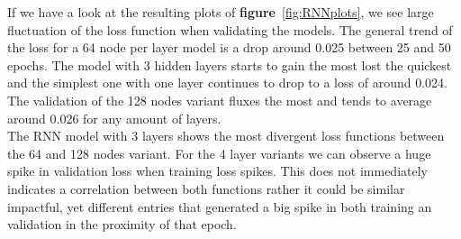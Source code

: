 \documentclass[11pt]
{article}
\begin{document}
If we have a look at the resulting plots of \textbf{figure}~\ref{fig:RNNplots}, we see large fluctuation of the loss function when validating the models. The general trend of the loss for a 64 node per layer model is a drop around 0.025 between 25 and 50 epochs. The model with 3 hidden layers starts to gain the most lost the quickest and the simplest one with one layer continues to drop to a loss of around 0.024. The validation of the 128 nodes variant  fluxes the most and tends to average around 0.026 for any amount of layers.
\\
The RNN model with 3 layers shows the most divergent loss functions between the 64 and 128 nodes variant. For the 4 layer variants we can observe a huge spike in validation loss when training loss spikes. This does not immediately indicates a correlation between both functions rather it could be similar impactful, yet different entries that generated a big spike in both training an validation in the proximity of that epoch.
\end{document}
